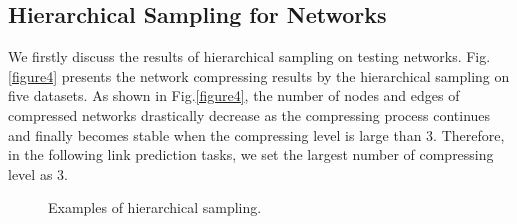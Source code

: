 \documentclass[conference]{IEEEtran}
\begin{document}
\subsection{Hierarchical Sampling for Networks}

\begin{figure*}
	\centering
	\caption{{\small The compressing ratio of nodesedges of compressed networks to the original network.}}\label{figure4}
\end{figure*}

We firstly discuss the results of hierarchical sampling on testing networks. Fig.\ref{figure4} presents the network compressing results by the hierarchical sampling on five datasets. As shown in Fig.\ref{figure4}, the number of nodes and edges of compressed networks drastically decrease as the compressing process continues and finally becomes stable when the compressing level is large than 3. Therefore, in the following link prediction tasks, we set the largest number of compressing level as 3.

\begin{figure}
	\centering
	\caption{{\small Examples of hierarchical sampling.}}\label{figure5}
\end{figure}
\end{document}
